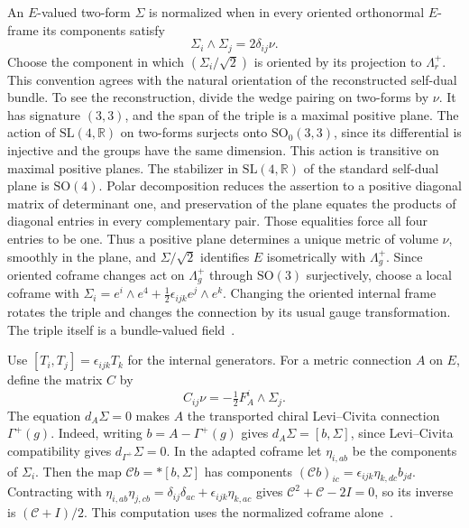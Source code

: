 \documentclass[11pt]{article}
\numberwithin{equation}{section}
\theoremstyle{definition}
\theoremstyle{remark}
\begin{document}
An \(E\)-valued two-form \(\Sigma\) is normalized when in every oriented
orthonormal \(E\)-frame its components satisfy
\begin{equation}\label{lift:normalization}
 \Sigma_i\wedge\Sigma_j=2\delta_{ij}\nu .
\end{equation}
Choose the component in which \((\Sigma_i/\sqrt2)\) is oriented
by its projection to \(\Lambda_r^+\). This convention agrees
with the natural orientation of the reconstructed self-dual bundle.
To see the reconstruction, divide the wedge pairing on two-forms by
\(\nu\). It has signature \((3,3)\), and the span of the triple is a
maximal positive plane. The action of \(\mathrm{SL}(4,\mathbb R)\) on
two-forms surjects onto \(\mathrm{SO}_0(3,3)\), since its differential is
injective and the groups have the same dimension. This action is
transitive on maximal positive planes. The stabilizer in
\(\mathrm{SL}(4,\mathbb R)\) of the standard self-dual plane is
\(\mathrm{SO}(4)\). Polar decomposition reduces the assertion to a positive
diagonal matrix of determinant one, and preservation of the plane
equates the products of diagonal entries in every complementary pair.
Those equalities force all four entries to be one. Thus a positive
plane determines a unique metric of volume \(\nu\), smoothly in the
plane, and \(\Sigma/\sqrt2\) identifies \(E\) isometrically with
\(\Lambda_g^+\). Since oriented coframe changes act on \(\Lambda_g^+\)
through \(\mathrm{SO}(3)\) surjectively, choose a local coframe with
\(\Sigma_i=e^i\wedge e^4+\tfrac12\epsilon_{ijk}e^j\wedge e^k\).
Changing the oriented internal frame rotates the triple and changes the
connection by its usual gauge transformation. The triple itself is a
bundle-valued field~\cite[Sections~1.3 and~1.6]{Fine2011}.

Use \([T_i,T_j]=\epsilon_{ijk}T_k\) for the internal generators. For a
metric connection \(A\) on \(E\), define the matrix \(C\) by
\begin{equation}\label{lift:projection}
 C_{ij}\nu=-\tfrac12 F_A^i\wedge\Sigma_j .
\end{equation}
The equation \(d_A\Sigma=0\) makes \(A\) the transported chiral
Levi--Civita connection \(\Gamma^+(g)\). Indeed, writing
\(b=A-\Gamma^+(g)\) gives \(d_A\Sigma=[b,\Sigma]\), since
Levi--Civita compatibility gives \(d_{\Gamma^+}\Sigma=0\).
In the adapted coframe let \(\eta_{i,ab}\) be the components of
\(\Sigma_i\). Then the map \(\mathscr C b=*[b,\Sigma]\) has components
\((\mathscr C b)_{ic}=\epsilon_{ijk}\eta_{k,dc}b_{jd}\).
Contracting with
\(\eta_{i,ab}\eta_{j,cb}=\delta_{ij}\delta_{ac}
+\epsilon_{ijk}\eta_{k,ac}\) gives
\(\mathscr C^2+\mathscr C-2I=0\), so its inverse is
\((\mathscr C+I)/2\). This computation uses the normalized coframe
alone~\cite[compatibility proposition]{Baker2026ChiralMetricEvolution}.
\end{document}
